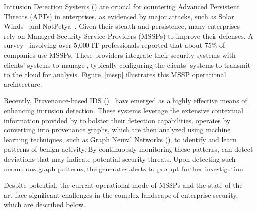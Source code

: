 


Intrusion Detection Systems (\ids) are crucial for countering Advanced Persistent Threats (APTs) in enterprises, as evidenced by major attacks, such as Solar Winds~\cite{solarwinds} and NotPetya~\cite{notpetya}. Given their stealth and persistence, many enterprises rely on Managed Security Service Providers (MSSPs) to improve their defenses. A survey~\cite{msspsurvey} involving over 5,000 IT professionals reported that about 75\% of companies use MSSPs. These providers integrate their security systems with clients' systems to manage \logs, typically configuring the clients' systems to transmit \logs to the cloud for analysis. Figure~\ref{mssp} illustrates this MSSP operational architecture.



Recently, Provenance-based IDS (\pids)~\cite{streamspot,provdetector2020,wang2022threatrace,shadewatcher,yangprographer,han2020unicorn,jia2023magic,flash2024,cheng2023kairos,sigl} have emerged as a highly effective means of enhancing intrusion detection. These systems leverage the extensive contextual information provided by \logs to bolster their detection capabilities. \pids operates by converting \logs into provenance graphs, which are then analyzed using machine learning techniques, such as Graph Neural Networks (\gnnshort), to identify and learn patterns of benign activity. By continuously monitoring these patterns, \pids can detect deviations that may indicate potential security threats. Upon detecting such anomalous graph patterns, the \pids generates alerts to prompt further investigation.

\smallskip
{}
\smallskip

\noindent
Despite \pids potential, the current operational mode of MSSPs and the state-of-the-art \pids face significant challenges in the complex landscape of enterprise security, which are described below.


